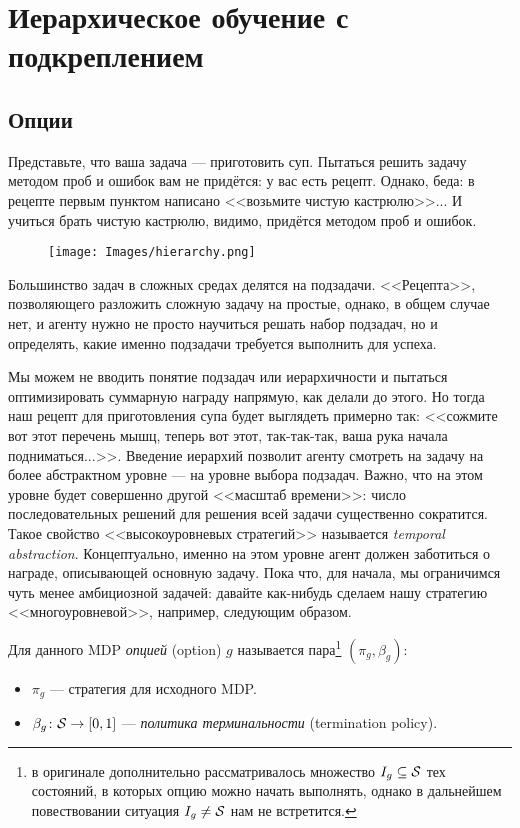 \section{Иерархическое обучение с подкреплением}

\subsection{Опции}

Представьте, что ваша задача --- приготовить суп. Пытаться решить задачу методом проб и ошибок вам не придётся: у вас есть рецепт. Однако, беда: в рецепте первым пунктом написано <<возьмите чистую кастрюлю>>... И учиться брать чистую кастрюлю, видимо, придётся методом проб и ошибок.

\begin{wrapfigure}{r}{0.5\textwidth}
\vspace{-0.4cm}
\centering
\texttt{[image: Images/hierarchy.png]}
\vspace{-0.5cm}
\end{wrapfigure}

Большинство задач в сложных средах делятся на подзадачи. <<Рецепта>>, позволяющего разложить сложную задачу на простые, однако, в общем случае нет, и агенту нужно не просто научиться решать набор подзадач, но и определять, какие именно подзадачи требуется выполнить для успеха.

Мы можем не вводить понятие подзадач или иерархичности и пытаться оптимизировать суммарную награду напрямую, как делали до этого. Но тогда наш рецепт для приготовления супа будет выглядеть примерно так: <<сожмите вот этот перечень мышц, теперь вот этот, так-так-так, ваша рука начала подниматься...>>. Введение иерархий позволит агенту смотреть на задачу на более абстрактном уровне --- на уровне выбора подзадач. Важно, что на этом уровне будет совершенно другой <<масштаб времени>>: число последовательных решений для решения всей задачи существенно сократится. Такое свойство <<высокоуровневых стратегий>> называется \emph{temporal abstraction}. Концептуально, именно на этом уровне агент должен заботиться о награде, описывающей основную задачу. Пока что, для начала, мы ограничимся чуть менее амбициозной задачей: давайте как-нибудь сделаем нашу стратегию <<многоуровневой>>, например, следующим образом.

\begin{definition}
\setcounter{footnote}{1}
Для данного MDP \emph{опцией} (option) $g$ называется пара\footnote{в оригинале дополнительно рассматривалось множество $I_g \subseteq \mathcal{S}$ тех состояний, в которых опцию можно начать выполнять, однако в дальнейшем повествовании ситуация $I_g \ne \mathcal{S}$ нам не встретится.} $(\pi_g, \beta_g)$:
\begin{itemize}
    \item $\pi_g$ --- стратегия для исходного MDP.
    \item $\beta_g \colon \mathcal{S} \to [0, 1]$ --- \emph{политика терминальности} (termination policy).
\end{itemize}
\end{definition}

